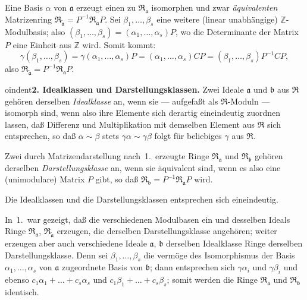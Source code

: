 \documentclass[12pt,a4paper]{article}
\newcommand{\mf}[1]{\mathfrak{#1}}     %
\newcommand{\ideala}{\mathfrak{a}}
\newcommand{\idealb}{\mathfrak{b}}
\newcommand{\ZZ}{\mathbb{Z}}            %
\theoremstyle{definition}
\begin{document}
Eine Basis $\alpha$ von $\ideala$ erzeugt einen zu $\mf{R}_{\ideala}$ isomorphen
und zwar \textit{\"aquivalenten} Matrizenring $\mf{R}_{\tilde{\ideala}} =
P^{-1}\mf{R}_{\ideala}P$. Sei $\beta_1,\dots,\beta_s$ eine weitere (linear
unabh\"angige) $\ZZ$-Modulbasis; also
$(\beta_1,\dots,\beta_s) = (\alpha_1,\dots,\alpha_s)P$, wo die Determinante
der Matrix $P$ eine Einheit aus $\ZZ$ wird. Somit kommt:
\[
\gamma(\beta_1,\dots,\beta_s) = \gamma(\alpha_1,\dots,\alpha_s)P
= (\alpha_1,\dots,\alpha_s)CP
= (\beta_1,\dots,\beta_s)P^{-1}CP,
\]
also $\mf{R}_{\tilde{\ideala}} = P^{-1}\mf{R}_{\ideala}P$.

\medskip



oindent\textbf{2. Idealklassen und Darstellungsklassen.} Zwei Ideale
$\ideala$ und $\idealb$ aus $\mf{R}$ geh\"oren derselben \textit{Idealklasse} an, wenn
sie --- aufgefa\ss t als $\mf{R}$-Moduln --- isomorph sind, wenn also ihre
Elemente sich derartig eineindeutig zuordnen lassen, da\ss{} Differenz und
Multiplikation mit demselben Element aus $\mf{R}$ sich entsprechen, so da\ss{}
$\alpha \sim \beta$ stets $\gamma\alpha \sim \gamma\beta$ folgt f\"ur beliebiges
$\gamma$ aus $\mf{R}$.

Zwei durch Matrizendarstellung nach~1.\ erzeugte Ringe
$\mf{R}_{\ideala}$ und $\mf{R}_{\idealb}$ geh\"oren derselben
\textit{Darstellungsklasse} an, wenn sie \"aquivalent sind, wenn es also eine
(unimodulare) Matrix $P$ gibt, so da\ss{} $\mf{R}_{\idealb} =
P^{-1}\mf{R}_{\ideala}P$ wird.

Die Idealklassen und die Darstellungsklassen entsprechen sich
eineindeutig.

In~1.\ war gezeigt, da\ss{} die verschiedenen Modulbasen ein und desselben
Ideals Ringe $\mf{R}_{\ideala}$, $\mf{R}_{\tilde{\ideala}}$ erzeugen, die derselben
Darstellungsklasse angeh\"oren; weiter erzeugen aber auch verschiedene Ideale
$\ideala$, $\idealb$ derselben Idealklasse Ringe derselben Darstellungsklasse.
Denn sei $\beta_1,\dots,\beta_s$ die verm\"oge des Isomorphismus der Basis
$\alpha_1,\dots,\alpha_s$ von $\ideala$ zugeordnete Basis von $\idealb$; dann
entsprechen sich $\gamma\alpha_i$ und $\gamma\beta_i$ und ebenso
$c_1\alpha_1 + \dots + c_s\alpha_s$ und $c_1\beta_1 + \dots + c_s\beta_s$; somit
werden die Ringe $\mf{R}_{\ideala}$ und $\mf{R}_{\idealb}$ identisch.
\end{document}
